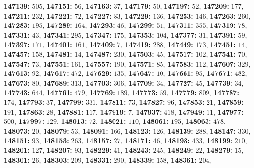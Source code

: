 \textsf{\bfseries 147139:} $505$, \textsf{\bfseries 147151:} $56$, \textsf{\bfseries 147163:} $37$, \textsf{\bfseries 147179:} $50$, \textsf{\bfseries 147197:} $52$, \textsf{\bfseries 147209:} $177$, \textsf{\bfseries 147211:} $232$, \textsf{\bfseries 147221:} $72$, \textsf{\bfseries 147227:} $83$, \textsf{\bfseries 147229:} $136$, \textsf{\bfseries 147253:} $146$, \textsf{\bfseries 147263:} $260$, \textsf{\bfseries 147283:} $195$, \textsf{\bfseries 147289:} $164$, \textsf{\bfseries 147293:} $46$, \textsf{\bfseries 147299:} $51$, \textsf{\bfseries 147311:} $355$, \textsf{\bfseries 147319:} $78$, \textsf{\bfseries 147331:} $43$, \textsf{\bfseries 147341:} $295$, \textsf{\bfseries 147347:} $175$, \textsf{\bfseries 147353:} $104$, \textsf{\bfseries 147377:} $31$, \textsf{\bfseries 147391:} $59$, \textsf{\bfseries 147397:} $171$, \textsf{\bfseries 147401:} $161$, \textsf{\bfseries 147409:} $7$, \textsf{\bfseries 147419:} $288$, \textsf{\bfseries 147449:} $173$, \textsf{\bfseries 147451:} $14$, \textsf{\bfseries 147457:} $158$, \textsf{\bfseries 147481:} $14$, \textsf{\bfseries 147487:} $230$, \textsf{\bfseries 147503:} $45$, \textsf{\bfseries 147517:} $102$, \textsf{\bfseries 147541:} $70$, \textsf{\bfseries 147547:} $73$, \textsf{\bfseries 147551:} $161$, \textsf{\bfseries 147557:} $190$, \textsf{\bfseries 147571:} $85$, \textsf{\bfseries 147583:} $112$, \textsf{\bfseries 147607:} $329$, \textsf{\bfseries 147613:} $92$, \textsf{\bfseries 147617:} $472$, \textsf{\bfseries 147629:} $135$, \textsf{\bfseries 147647:} $10$, \textsf{\bfseries 147661:} $95$, \textsf{\bfseries 147671:} $482$, \textsf{\bfseries 147673:} $80$, \textsf{\bfseries 147689:} $313$, \textsf{\bfseries 147703:} $306$, \textsf{\bfseries 147709:} $34$, \textsf{\bfseries 147727:} $45$, \textsf{\bfseries 147739:} $34$, \textsf{\bfseries 147743:} $644$, \textsf{\bfseries 147761:} $479$, \textsf{\bfseries 147769:} $189$, \textsf{\bfseries 147773:} $59$, \textsf{\bfseries 147779:} $809$, \textsf{\bfseries 147787:} $174$, \textsf{\bfseries 147793:} $37$, \textsf{\bfseries 147799:} $331$, \textsf{\bfseries 147811:} $73$, \textsf{\bfseries 147827:} $96$, \textsf{\bfseries 147853:} $21$, \textsf{\bfseries 147859:} $191$, \textsf{\bfseries 147863:} $28$, \textsf{\bfseries 147881:} $117$, \textsf{\bfseries 147919:} $7$, \textsf{\bfseries 147937:} $418$, \textsf{\bfseries 147949:} $11$, \textsf{\bfseries 147977:} $500$, \textsf{\bfseries 147997:} $129$, \textsf{\bfseries 148013:} $72$, \textsf{\bfseries 148021:} $110$, \textsf{\bfseries 148061:} $195$, \textsf{\bfseries 148063:} $478$, \textsf{\bfseries 148073:} $20$, \textsf{\bfseries 148079:} $53$, \textsf{\bfseries 148091:} $166$, \textsf{\bfseries 148123:} $126$, \textsf{\bfseries 148139:} $288$, \textsf{\bfseries 148147:} $330$, \textsf{\bfseries 148151:} $93$, \textsf{\bfseries 148153:} $263$, \textsf{\bfseries 148157:} $27$, \textsf{\bfseries 148171:} $46$, \textsf{\bfseries 148193:} $433$, \textsf{\bfseries 148199:} $210$, \textsf{\bfseries 148201:} $127$, \textsf{\bfseries 148207:} $93$, \textsf{\bfseries 148229:} $41$, \textsf{\bfseries 148243:} $245$, \textsf{\bfseries 148249:} $22$, \textsf{\bfseries 148279:} $15$, \textsf{\bfseries 148301:} $26$, \textsf{\bfseries 148303:} $209$, \textsf{\bfseries 148331:} $290$, \textsf{\bfseries 148339:} $158$, \textsf{\bfseries 148361:} $204$, 

